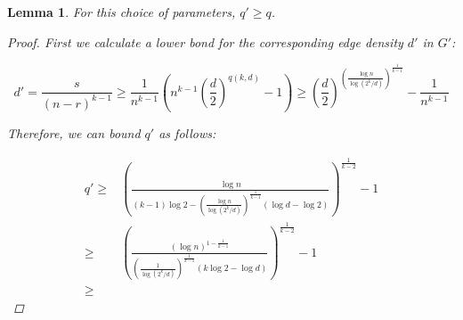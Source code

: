 \documentclass[12pt]{article}
\newtheorem{lemma}[thm]{Lemma}
\begin{document}
    \begin{lemma} \label{lemma:q_prime}
        For this choice of parameters, $q' \geq q$.

        \begin{proof}
            First we calculate a lower bond for the corresponding edge density $d'$ in $G'$:

            \begin{equation*}
                d' = \frac{s}{(n-r)^{k-1}} \geq \frac{1}{n^{k-1}} \left(  n^{k-1} \left( \frac{d}{2} \right)^{q(k, d)} - 1\right)
                \geq \left( \frac{d}{2} \right)^{\left(  \frac{\log n}{\log (2^k/d)} \right)^{\frac{1}{k-1}}} - \frac{1}{n^{k-1}}
            \end{equation*}

            Therefore, we can bound $q'$ as follows:

            \begin{align*} %
                q' \geq &
                \left(
                \frac{\log n}{(k-1) \log 2 - \left(\frac{\log n}{\log (2^k/d)} \right)^{\frac{1}{k-1}} (\log d - \log 2)}
                \right)^{\frac{1}{k-2}} - 1 \\
                \geq &
                \left(
                \frac{(\log n)^{1 - \frac{1}{k-1}}}{\left(\frac{1}{\log (2^k/d)} \right)^{\frac{1}{k-1}} (k \log 2 - \log d)}
                \right)^{\frac{1}{k-2}} - 1 \\
                \geq &
            \end{align*}


        \end{proof}

    \end{lemma}








    
    
\end{document}
